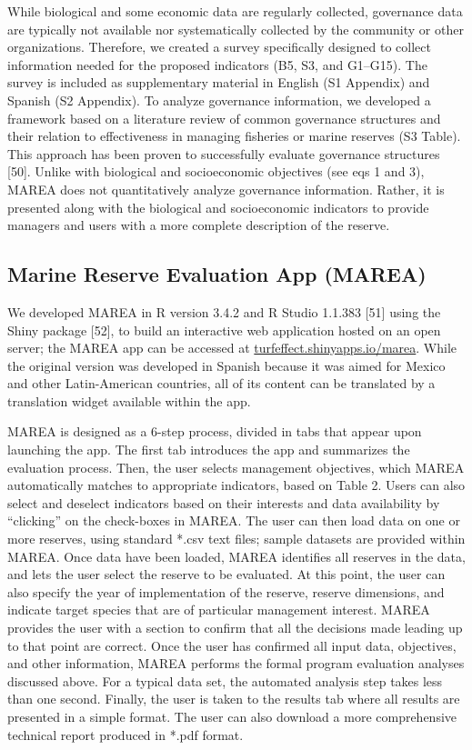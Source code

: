 \documentclass[12pt,]{article}
\begin{document}
While biological and some economic data are regularly collected,
governance data are typically not available nor systematically collected
by the community or other organizations. Therefore, we created a survey
specifically designed to collect information needed for the proposed
indicators (B5, S3, and G1--G15). The survey is included as
supplementary material in English (S1 Appendix) and Spanish (S2
Appendix). To analyze governance information, we developed a framework
based on a literature review of common governance structures and their
relation to effectiveness in managing fisheries or marine reserves (S3
Table). This approach has been proven to successfully evaluate
governance structures {[}50{]}. Unlike with biological and socioeconomic
objectives (see eqs 1 and 3), MAREA does not quantitatively analyze
governance information. Rather, it is presented along with the
biological and socioeconomic indicators to provide managers and users
with a more complete description of the reserve.

\subsection{Marine Reserve Evaluation App
(MAREA)}\label{marine-reserve-evaluation-app-marea}

We developed MAREA in R version 3.4.2 and R Studio 1.1.383 {[}51{]}
using the Shiny package {[}52{]}, to build an interactive web
application hosted on an open server; the MAREA app can be accessed at
\href{turfeffect.shinyapps.io/marea/}{turfeffect.shinyapps.io/marea}.
While the original version was developed in Spanish because it was aimed
for Mexico and other Latin-American countries, all of its content can be
translated by a translation widget available within the app.

MAREA is designed as a 6-step process, divided in tabs that appear upon
launching the app. The first tab introduces the app and summarizes the
evaluation process. Then, the user selects management objectives, which
MAREA automatically matches to appropriate indicators, based on Table 2.
Users can also select and deselect indicators based on their interests
and data availability by ``clicking'' on the check-boxes in MAREA. The
user can then load data on one or more reserves, using standard *.csv
text files; sample datasets are provided within MAREA. Once data have
been loaded, MAREA identifies all reserves in the data, and lets the
user select the reserve to be evaluated. At this point, the user can
also specify the year of implementation of the reserve, reserve
dimensions, and indicate target species that are of particular
management interest. MAREA provides the user with a section to confirm
that all the decisions made leading up to that point are correct. Once
the user has confirmed all input data, objectives, and other
information, MAREA performs the formal program evaluation analyses
discussed above. For a typical data set, the automated analysis step
takes less than one second. Finally, the user is taken to the results
tab where all results are presented in a simple format. The user can
also download a more comprehensive technical report produced in *.pdf
format.
\end{document}
